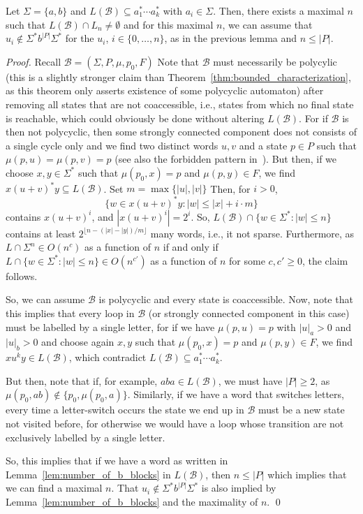 \begin{toappendix}
\begin{lemma}
\label{lem:maximal_n}
 Let $\Sigma = \{a,b\}$ and $L(\mathcal B) \subseteq a_1^* \cdots a_k^*$
 with $a_i \in \Sigma $.
 Then, there exists a maximal $n$
 such that $L(\mathcal B) \cap L_n \ne \emptyset$
 and for this maximal $n$,
 we can assume that $u_i \notin \Sigma^* b^{|P|} \Sigma^*$
 for the $u_i$, $i \in \{0,\ldots,n\}$, as in the previous lemma
 and $n \le |P|$. 
\end{lemma}
\begin{proof}
 Recall $\mathcal B = (\Sigma, P, \mu, p_0, F)$
 Note that $\mathcal B$ must necessarily be polycylic (this is a slightly stronger
 claim than Theorem~\ref{thm:bounded_characterization}, as this theorem
 only asserts existence of some polycyclic automaton)
 after removing all states that are not coaccessible, i.e., states from which no final state is reachable,
 which could obviously be done without altering $L(\mathcal B)$.
 For if $\mathcal B$ is then not polycyclic, then some strongly
 connected component does not consists of a single cycle only
 and we find two distinct words $u, v$ and a state $p \in P$
 such that $\mu(p, u) = \mu(p, v) = p$ (see also the forbidden
 pattern in~\cite[Theorem 4.29]{Pin2020}).
 But then, if we choose $x,y \in \Sigma^*$
 such that $\mu(p_0, x) = p$
 and $\mu(p, y) \in F$, we find $x(u+v)^*y \subseteq L(\mathcal B)$.
 Set $m = \max\{|u|, |v|\}$
 Then, for $i > 0$,
 \[
  \{ w \in x(u+v)^*y : |w| \le |x| + i \cdot m\}
 \]
 contains $x(u+v)^i$, and $|x(u+v)^i| = 2^i$.
 So, $L(\mathcal B) \cap \{ w \in \Sigma^* : |w| \le n \}$
 contains at least $2^{\lfloor n - (|x| - |y|) / m \rfloor}$
 many words, i.e., it not sparse.
 Furthermore, as $L \cap \Sigma^n \in O(n^c)$
 as a function of $n$ if and only if $L \cap \{ w \in \Sigma^* : |w| \le n \} \in O(n^{c'})$
 as a function of $n$ for some $c,c' \ge 0$,
 the claim follows.
 
 So, we can assume $\mathcal B$ is polycyclic and every state is coaccessible.
 Now, note that this implies that every loop in $\mathcal B$ (or strongly connected component
 in this case) must be labelled by a single letter, for if we
 have $\mu(p, u) = p$ with $|u|_a > 0$ and $|u|_b > 0$
 and choose again $x,y$ such that $\mu(p_0, x) = p$
 and $\mu(p, y) \in F$,
 we find $xu^ky \in L(\mathcal B)$, which contradict $L(\mathcal B) \subseteq a_1^* \cdots a_k^*$.
 
 But then, note that if, for example, $aba \in L(\mathcal B)$,
 we must have $|P| \ge 2$, as $\mu(p_0, ab) \notin \{ p_0, \mu(p_0,a) \}$.
 Similarly, if we have a word that switches letters, every time a letter-switch
 occurs the state we end up in $\mathcal B$ must be a new state not visited before,
 for otherwise we would have a loop whose transition are not exclusively
 labelled by a single letter.
 
 So, this implies that 
 if we have a word as written in Lemma~\ref{lem:number_of_b_blocks}
 in $L(\mathcal B)$, then $n \le |P|$
 which implies that we can find a maximal $n$.
 That $u_i \notin \Sigma^* b^{|P|} \Sigma^*$
 is also implied by Lemma~\ref{lem:number_of_b_blocks}
 and the maximality of $n$. \qed
\end{proof}
\end{toappendix}


